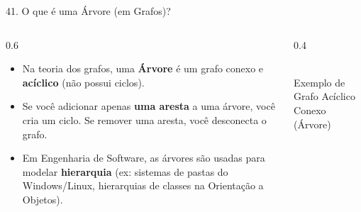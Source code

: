 \documentclass[9pt]{beamer}
\begin{document}
    \begin{frame}{41. O que é uma Árvore (em Grafos)?}
        \begin{columns}
            \begin{column}{0.6\textwidth}
                \begin{itemize}
                    \item Na teoria dos grafos, uma \textbf{Árvore} é um grafo conexo e \textbf{acíclico} (não possui ciclos).
                    \item Se você adicionar apenas \textbf{uma aresta} a uma árvore, você cria um ciclo. Se remover uma aresta, você desconecta o grafo.
                    \item Em Engenharia de Software, as árvores são usadas para modelar \textbf{hierarquia} (ex: sistemas de pastas do Windows/Linux, hierarquias de classes na Orientação a Objetos).
                \end{itemize}
            \end{column}
            \begin{column}{0.4\textwidth}
                \centering
                \\
                \vspace{0.2cm}
                \tiny Exemplo de Grafo Acíclico Conexo (Árvore)
            \end{column}
        \end{columns}
    \end{frame}
\end{document}
